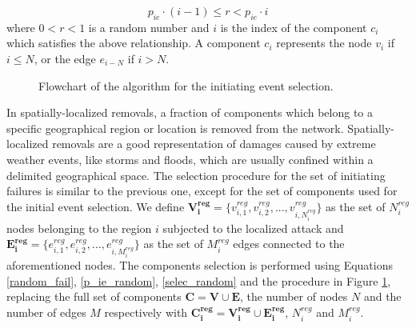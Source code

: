 \documentclass[review]{elsarticle}
\begin{document}
    \begin{equation}
        p_{ie} \cdot (i-1) \le r < p_{ie} \cdot i
        \label{selec_random}
    \end{equation}
    where $0<r<1$ is a random number and $i$ is the index of the component $c_i$ which satisfies the above relationship. A component $c_i$ represents the node $v_i$ if $i\le N$, or the edge $e_{i-N}$ if $i>N$.
    
\begin{figure}[h]
	\centering
	\caption{Flowchart of the algorithm for the initiating event selection.}
	\label{algo_ie}
\end{figure}
    


   
    In spatially-localized removals, a fraction of components which belong to a specific geographical region or location is removed from the network. Spatially-localized removals are a good representation of damages caused by extreme weather events, like storms and floods, which are usually confined within a delimited geographical space. The selection procedure for the set of initiating failures is similar to the previous one, except for the set of components used for the initial event selection. We define $\mathbf{V^{reg}_{i}}=\{ v^{reg}_{i,1}, v^{reg}_{i,2},...,v^{reg}_{i,N^{reg}_{i}} \}$ as the set of $N^{reg}_{i}$ nodes belonging to the region $i$ subjected to the localized attack and $\mathbf{E^{reg}_{i}}=\{ e^{reg}_{i,1}, e^{reg}_{i,2},...,e^{reg}_{i,M^{reg}_{i}} \}$ as the set of $M^{reg}_{i}$ edges connected to the aforementioned nodes. The components selection is performed using Equations \eqref{random_fail}, \eqref{p_ie_random}, \eqref{selec_random} and the procedure in Figure \ref{algo_ie}, replacing the full set of components $\mathbf{C} = \mathbf{V} \displaystyle \cup \mathbf{E} $, the number of nodes $N$ and the number of edges $M$ respectively with $\mathbf{C^{reg}_{i}} = \mathbf{V^{reg}_{i}} \displaystyle \cup \mathbf{E^{reg}_{i}} $, $N^{reg}_{i}$ and $M^{reg}_{i}$.
\end{document}
